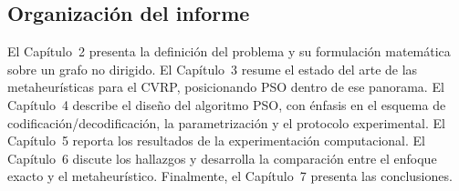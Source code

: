 \subsection{Organización del informe}

El Capítulo~2 presenta la definición del problema y su formulación matemática sobre un
grafo no dirigido. El Capítulo~3 resume el estado del arte de las metaheurísticas para el
CVRP, posicionando PSO dentro de ese panorama. El Capítulo~4 describe el diseño del
algoritmo PSO, con énfasis en el esquema de codificación/decodificación, la
parametrización y el protocolo experimental. El Capítulo~5 reporta los resultados de la
experimentación computacional. El Capítulo~6 discute los hallazgos y desarrolla la
comparación entre el enfoque exacto y el metaheurístico. Finalmente, el Capítulo~7
presenta las conclusiones.
